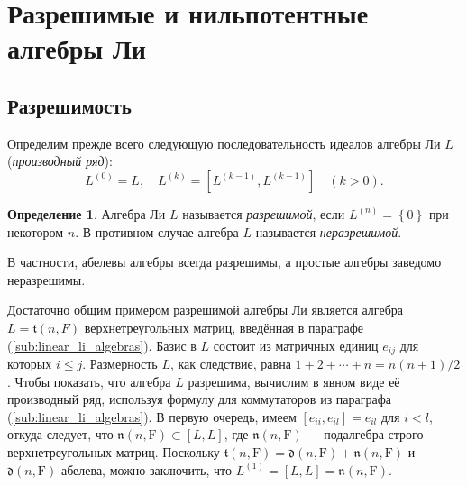 \documentclass[a4paper, 12pt]{article}
\theoremstyle{definition}
\newtheorem{definition}{Определение}[section]
\begin{document}
\section{Разрешимые и нильпотентные алгебры Ли}
\subsection{Разрешимость}

Определим прежде всего следующую последовательность идеалов алгебры Ли \({ L }\) (\textit{производный ряд}):
\[
    L^{(0)} = L, \quad L^{(k)} = [L^{(k - 1)}, L^{(k - 1)}] \quad (k > 0).
\]

\begin{definition}
Алгебра Ли \({ L }\) называется \textit{разрешимой}, если \({ L^{(n)} = \left\{ 0 \right\} }\) при некотором \({ n }\). В противном случае алгебра \({ L }\) называется \textit{неразрешимой}.
\end{definition}

В частности, абелевы алгебры всегда разрешимы, а простые алгебры заведомо неразрешимы.

Достаточно общим примером разрешимой алгебры Ли является алгебра \({ L = \mathfrak{t} (n, F) }\) верхнетреугольных матриц, введённая в параграфе (\ref{sub:linear_li_algebras}). Базис в \({ L }\) состоит из матричных единиц \({ e_{ij} }\) для которых \({ i \leqslant j }\). Размерность \({ L }\), как следствие, равна \({ 1 + 2 + \cdots + n = n(n + 1)/2 }\). Чтобы показать, что алгебра \({ L }\) разрешима, вычислим в явном виде её производный ряд, используя формулу для коммутаторов из параграфа (\ref{sub:linear_li_algebras}). В первую очередь, имеем \({ [e_{ii}, e_{il}] = e_{il} }\) для \({ i < l }\), откуда следует, что \({ \mathfrak{n}(n, \mathrm F) \subset [L, L] }\), где \({ \mathfrak{n}(n, \mathrm F) }\) --- подалгебра строго верхнетреугольных матриц. Поскольку \({ \mathfrak{t}(n ,\mathrm F) = \mathfrak{d}(n, \mathrm F) + \mathfrak{n}(n, \mathrm F) }\) и \({ \mathfrak{d}(n, \mathrm F) }\) абелева, можно заключить, что \({ L^{(1)} = [L, L] = \mathfrak{n}(n, \mathrm F) }\).
\end{document}
